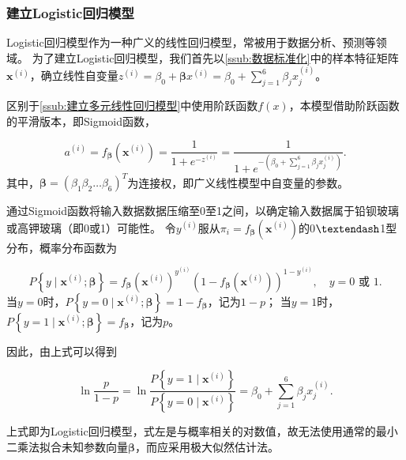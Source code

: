 
\subsubsection{建立Logistic回归模型} %
\label{ssub:建立logistic回归模型}

Logistic回归模型作为一种广义的线性回归模型，常被用于数据分析、预测等领域。
为了建立Logistic回归模型，我们首先以\ref{ssub:数据标准化}中的样本特征矩阵$\boldsymbol{x}^{(i)}$，确立线性自变量$z^{(i)}=\beta_0+\boldsymbol{\beta}x^{(i)}=\beta_0+\sum^6_{j=1}\beta_jx^{(i)}_j$。

区别于\ref{ssub:建立多元线性回归模型}中使用阶跃函数$f(x)$，本模型借助阶跃函数的平滑版本，即Sigmoid函数，

\begin{equation}
	a^{(i)}=f_{\boldsymbol{\beta}}\left(\boldsymbol{x}^{(i)}\right)=\frac{1}{1+e^{-z^{(i)}}}=\frac{1}{1+e^{-\left(\beta_{0}+\sum_{j=1}^{6} \beta_{j} x_{j}^{(i)}\right)}}.
\end{equation}
其中，$\boldsymbol{\beta}=(\beta_1 \beta_2\dots \beta_6)^T$为连接权，即广义线性模型中自变量的参数。

通过Sigmoid函数将输入数据数据压缩至0至1之间，以确定输入数据属于铅钡玻璃或高钾玻璃（即0或1）可能性。
令$y^{(i)}$服从$\pi_{i}=f_{\boldsymbol{\beta}}\left(\boldsymbol{x}^{(i)}\right)$的0$\textendash$1型分布，概率分布函数为

\begin{equation}
	P\left\{y \mid \boldsymbol{x}^{(i)} ; \boldsymbol{\beta}\right\}=f_{\boldsymbol{\beta}}\left(\boldsymbol{x}^{(i)}\right)^{y^{(i)}}\left(1-f_{\boldsymbol{\beta}}\left(\boldsymbol{x}^{(i)}\right)\right)^{1-y^{(i)}},\quad y=0 \text { 或 } 1.
\end{equation}
当$y=0$时，$P\left\{y=0 \mid \boldsymbol{x}^{(i)} ; \boldsymbol{\beta}\right\}=1-f_{\boldsymbol{\beta}}$，记为$1-p$；
当$y=1$时，$P\left\{y=1 \mid \boldsymbol{x}^{(i)} ; \boldsymbol{\beta}\right\}=f_{\boldsymbol{\beta}}$，记为$p$。

因此，由上式可以得到

\begin{equation}
	\ln \frac{p}{1-p}=\ln \frac{P\left\{y=1 \mid \boldsymbol{x}^{(i)}\right\}}{P\left\{y=0 \mid \boldsymbol{x}^{(i)}\right\}}=\beta_{0}+\sum_{j=1}^{6} \beta_{j} x_{j}^{(i)}.
\end{equation}

上式即为Logistic回归模型，式左是与概率相关的对数值，故无法使用通常的最小二乘法拟合未知参数向量$\boldsymbol{\beta}$，而应采用极大似然估计法。

